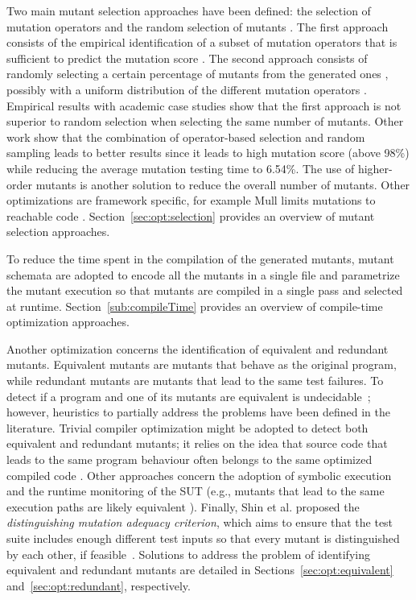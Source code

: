 Two main mutant selection approaches have been defined: the selection of mutation operators and the random selection of mutants \cite{zhang2010operator}. The first approach consists of the empirical identification of a subset of mutation operators that is sufficient to predict the mutation score \cite{siami2008sufficient,barbosa2001toward}. The second approach consists of randomly selecting a certain percentage of mutants from the generated ones \cite{wong1995reducing}, possibly with a uniform distribution of the different mutation operators \cite{zhang2010operator}. Empirical results with academic case studies \cite{zhang2010operator} show that the first approach is not superior to random selection when selecting the same number of mutants. Other work \cite{zhang2013operator} show that the combination of operator-based selection and random sampling leads to better results since it leads to high mutation score (above 98\%) while reducing the average mutation testing time to 6.54\%. The use of higher-order mutants is another solution to reduce the overall number of mutants. Other optimizations are framework specific, for example Mull limits mutations to reachable code \cite{hariri2018srciror}. Section~\ref{sec:opt:selection} provides an overview of mutant selection approaches.

To reduce the time spent in the compilation of the generated mutants, mutant schemata \cite{untch1993mutation} are adopted to encode all the mutants in a single file and parametrize the mutant execution so that mutants are compiled in a single pass and selected at runtime. Section~\ref{sub:compileTime} provides an overview of compile-time optimization approaches.


Another optimization concerns the identification of equivalent and redundant mutants. Equivalent mutants are mutants that behave as the original program, while redundant mutants are mutants that lead to the same test failures. 
To detect if a program and one of its mutants are
equivalent is undecidable~\cite{Budd:1982}; however, heuristics to partially address the problems have been defined in the literature.
Trivial compiler optimization might be adopted to detect both equivalent and redundant mutants; it relies on the idea that source code that leads to the same program behaviour often belongs to the same optimized compiled code \cite{papadakis2015trivial}. Other approaches concern the adoption of symbolic execution \cite{papadakis2012mutation,kurtz2015static} and the runtime monitoring of the SUT (e.g., mutants that lead to the same execution paths are likely equivalent \cite{schuler2013covering}). Finally, Shin et al. proposed the \emph{distinguishing mutation adequacy criterion}, which aims to ensure that the test suite includes enough different test inputs so that every mutant is distinguished by each other, if feasible~\cite{Shin:TSE:2018}. 
Solutions to address the problem of identifying equivalent and redundant mutants are detailed in Sections~\ref{sec:opt:equivalent} and~\ref{sec:opt:redundant}, respectively.



